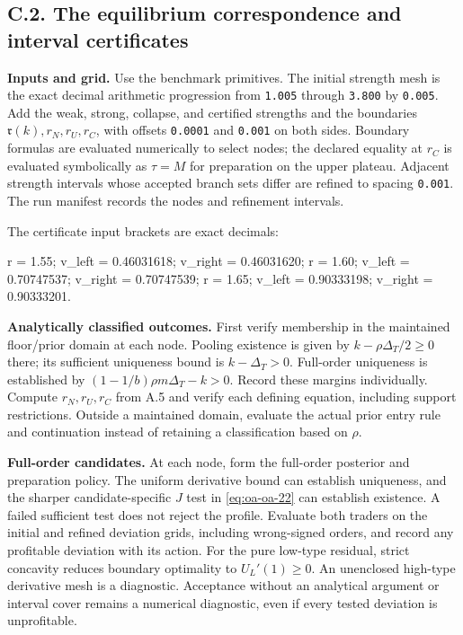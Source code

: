 \documentclass[
  11pt,
]{article}
\newenvironment{Shaded}{}{}
\newcommand{\NormalTok}[1]{#1}
\begin{document}


\subsection{C.2. The equilibrium correspondence and interval
certificates}\label{oa-c-correspondence}

\textbf{Inputs and grid.} Use the benchmark primitives. The initial
strength mesh is the exact decimal arithmetic progression from
\texttt{1.005} through \texttt{3.800} by \texttt{0.005}. Add the weak,
strong, collapse, and certified strengths and the boundaries
\(\mathfrak r(k),r_N,r_U,r_C\), with offsets \texttt{0.0001} and
\texttt{0.001} on both sides. Boundary formulas are evaluated
numerically to select nodes; the declared equality at \(r_C\) is
evaluated symbolically as \(\tau=M\) for preparation on the upper
plateau. Adjacent strength intervals whose accepted branch sets differ
are refined to spacing \texttt{0.001}. The run manifest records the
nodes and refinement intervals.

The certificate input brackets are exact decimals:

\begin{Shaded}
\begin{Highlighting}[]
\NormalTok{r = 1.55; v\_left = 0.46031618; v\_right = 0.46031620;}
\NormalTok{r = 1.60; v\_left = 0.70747537; v\_right = 0.70747539;}
\NormalTok{r = 1.65; v\_left = 0.90333198; v\_right = 0.90333201.}
\end{Highlighting}
\end{Shaded}

\textbf{Analytically classified outcomes.} First verify membership in
the maintained floor/prior domain at each node. Pooling existence is
given by \(k-\rho\Delta_T/2\ge0\) there; its sufficient uniqueness bound
is \(k-\Delta_T>0\). Full-order uniqueness is established by
\((1-1/b)\rho m\Delta_T-k>0\). Record these margins individually.
Compute \(r_N,r_U,r_C\) from A.5 and verify each defining equation,
including support restrictions. Outside a maintained domain, evaluate
the actual prior entry rule and continuation instead of retaining a
classification based on \(\rho\).

\textbf{Full-order candidates.} At each node, form the full-order
posterior and preparation policy. The uniform derivative bound can
establish uniqueness, and the sharper candidate-specific \(J\) test in
\eqref{eq:oa-oa-22} can establish existence. A failed sufficient test
does not reject the profile. Evaluate both traders on the initial and
refined deviation grids, including wrong-signed orders, and record any
profitable deviation with its action. For the pure low-type residual,
strict concavity reduces boundary optimality to \(U_L'(1)\ge0\). An
unenclosed high-type derivative mesh is a diagnostic. Acceptance without
an analytical argument or interval cover remains a numerical diagnostic,
even if every tested deviation is unprofitable.
\end{document}
